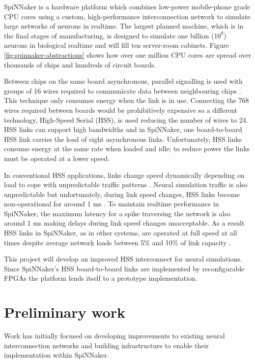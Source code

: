 	SpiNNaker is a hardware platform which combines low-power mobile-phone grade
	CPU cores using a custom, high-performance interconnection network to simulate
	large networks of neurons in realtime. The largest planned machine, which is
	in the final stages of manufacturing, is designed to simulate one billion
	($10^9$) neurons in biological realtime \cite{navaridas09} and will fill ten
	server-room cabinets. Figure \ref{fig:spinnaker-abstractions} shows how over
	one million CPU cores are spread over thousands of chips and hundreds of
	circuit boards.
	
	Between chips on the same board asynchronous, parallel signalling is used with
	groups of 16 wires required to communicate data between neighbouring chips
	\cite{bainbridge02}. This technique only consumes energy when the link is in
	use. Connecting the 768 wires required between boards would be prohibitively
	expensive so a different technology, High-Speed Serial (HSS), is used
	\cite{athavale05} reducing the number of wires to 24. HSS links can support high bandwidths and in SpiNNaker, one
	board-to-board HSS link carries the load of eight asynchronous links.
	Unfortunately, HSS links consume energy at the same rate when loaded and idle;
	to reduce power the links must be operated at a lower speed.
	
	In conventional HSS applications, links change speed dynamically depending on
	load to cope with unpredictable traffic patterns \cite{infinibandta08}. Neural
	simulation traffic is also unpredictable but unfortunately, during link speed
	changes, HSS links become non-operational for around 1 ms \cite{xilinx14}. To
	maintain realtime performance in SpiNNaker, the maximum latency for a spike
	traversing the network is also around 1 ms making delays during link speed
	changes unacceptable. As a result HSS links in SpiNNaker, as in other systems,
	are operated at full speed at all times despite average network loads between
	5\% and 10\% of link capacity \cite{moore12,navaridas09}.
	
	This project will develop an improved HSS interconnect for neural simulations.
	Since SpiNNaker's HSS board-to-board links are implemented by reconfigurable
	FPGAs the platform lends itself to a prototype implementation.

\section{Preliminary work}
	
	Work has initially focused on developing improvements to existing neural
	interconnection networks and building infrastructure to enable their
	implementation within SpiNNaker.
	
